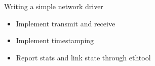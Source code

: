 \setuplabframe
{Writing a simple network driver}
{
  \begin{itemize}
  \item Implement transmit and receive
  \item Implement timestamping
  \item Report stats and link state through ethtool
  \end{itemize}
}
